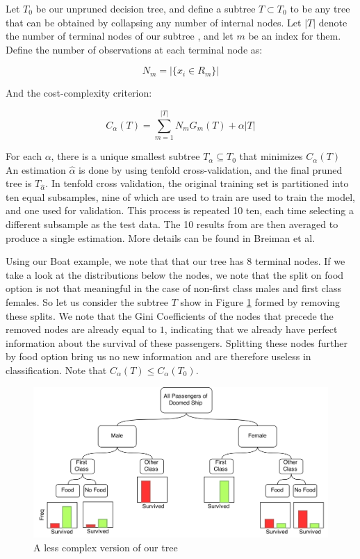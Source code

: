 \documentclass[preprint,12pt]{elsarticle}
\begin{document}
Let $T_{0}$ be our unpruned decision tree, and define a subtree $T \subset T_{0}$ to be any tree that can be obtained by collapsing any number of internal nodes. Let $|T|$ denote the number of terminal nodes of our subtree , and let $m$ be an index for them. Define the number of observations at each terminal node as:

$$N_{m} = |\{x_{i} \in R_{m}\}| $$

\noindent And the cost-complexity criterion:

$$C_{\alpha}(T) = \sum\limits_{m=1}^{|T|} N_{m}G_{m}(T) + \alpha|T|$$

For each $\alpha$, there is a unique smallest subtree $T_{\alpha} \subseteq T_{0}$ that minimizes $C_{\alpha}(T)$ An estimation  $\hat{\alpha}$ is done by using tenfold cross-validation, and the final pruned tree is $T_{\hat{\alpha}}$. In tenfold cross validation, the original training set is partitioned into ten equal subsamples, nine of which are used to train are used to train the model, and one used for validation. This process is repeated 10 ten, each time selecting a different subsample as the test data. The 10 results from are then averaged to produce a single estimation. More details can be found in Breiman et al.\cite{Breiman1984}

Using our Boat example, we note that that our tree has 8 terminal nodes. If we take a look at the distributions below the nodes, we note that the split on food option is not that meaningful in the case of non-first class males and first class females. So let us consider the subtree $T$ show in Figure \ref{fig:Pruned} formed by removing these splits. We note that the Gini Coefficients of the nodes that precede the removed nodes are already equal to $1$, indicating that we already have perfect information about the survival of these passengers. Splitting these nodes further by food option bring us no new information and are therefore useless in classification.
Note that $C_{\alpha}(T) \leq C_{\alpha}(T_{0})$.

\begin{figure}[h]
	\centering
	\includegraphics[width=1\textwidth]{PrunedBoat}
	\caption{A less complex version of our tree}
	\label{fig:Pruned}
\end{figure}
\end{document}
